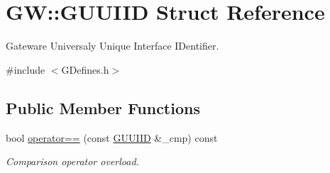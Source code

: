 \hypertarget{struct_g_w_1_1_g_u_u_i_i_d}{}\section{GW\+:\+:G\+U\+U\+I\+ID Struct Reference}
\label{struct_g_w_1_1_g_u_u_i_i_d}


Gateware Universaly Unique Interface I\+Dentifier.  




{\ttfamily \#include $<$G\+Defines.\+h$>$}

\subsection*{Public Member Functions}
\begin{DoxyCompactItemize}
\item 
\hypertarget{struct_g_w_1_1_g_u_u_i_i_d_a91cfd5559e56d01dd58d0d60f1704bd6}{}\label{struct_g_w_1_1_g_u_u_i_i_d_a91cfd5559e56d01dd58d0d60f1704bd6} 
bool \hyperlink{struct_g_w_1_1_g_u_u_i_i_d_a91cfd5559e56d01dd58d0d60f1704bd6}{operator==} (const \hyperlink{struct_g_w_1_1_g_u_u_i_i_d}{G\+U\+U\+I\+ID} \&\+\_\+cmp) const
\begin{DoxyCompactList}\small\item\em Comparison operator overload. \end{DoxyCompactList}\end{DoxyCompactItemize}
